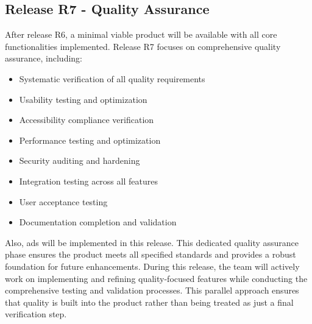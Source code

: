 \subsection{Release R7 - Quality Assurance}
After release R6, a minimal viable product will be available with all core functionalities implemented. Release R7 focuses on comprehensive quality assurance, including:

\begin{itemize}
\item Systematic verification of all quality requirements
\item Usability testing and optimization
\item Accessibility compliance verification
\item Performance testing and optimization
\item Security auditing and hardening
\item Integration testing across all features
\item User acceptance testing
\item Documentation completion and validation
\end{itemize}

Also, ads will be implemented in this release. This dedicated quality assurance phase ensures the product meets all specified standards and provides a robust foundation for future enhancements. During this release, the team will actively work on implementing and refining quality-focused features while conducting the comprehensive testing and validation processes. This parallel approach ensures that quality is built into the product rather than being treated as just a final verification step.
